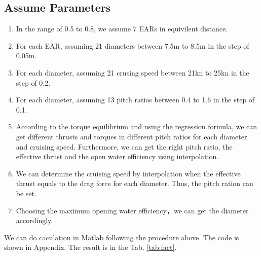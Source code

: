 \documentclass[a4paper,UTF8]{article}
\begin{document}
\subsection{Assume Parameters}
\begin{enumerate}
	\item In the range of 0.5 to 0.8, we assume 7 EARs in equivilent distance.
	\item For each EAR, assuming 21 diameters between 7.5m to 8.5m in the step of 0.05m. 
	\item For each diameter, assuming 21 crusing speed between 21kn to 25kn in the step of 0.2.
	\item For each diameter, assuming 13 pitch ratios between 0.4 to 1.6 in the step of 0.1.
	\item According to the torque equilibrium and using the regression formula, we can get different thrusts and torques in different pitch ratios for each diameter and cruising speed. Furthermore, we can get the right pitch ratio, the effective thrust and the open water efficiency using interpolation.
	\item We can determine the cruising speed by interpolation when the effective thrust equals to the drag force for each diameter. Thus, the pitch ration can be set.
	\item Choosing the maximum opening water efficiency，we can get the diameter accordingly.
\end{enumerate}
We can do caculation in Matlab following the procedure above. The code is shown in Appendix. The result is in the Tab. \ref{tab:fact}.
\end{document}
